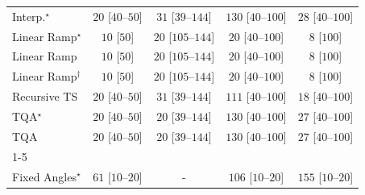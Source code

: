 \begin{tabular}{l|cccc|}
Interp.$^\star$ & {\cellcolor[HTML]{F5FBF2}} \color[HTML]{000000} $20$ [$40$--$50$] & {\cellcolor[HTML]{F3FAF0}} \color[HTML]{000000} $31$ [$39$--$144$] & {\cellcolor[HTML]{DFF3DA}} \color[HTML]{000000} $130$ [$40$--$100$] & {\cellcolor[HTML]{F4FBF1}} \color[HTML]{000000} $28$ [$40$--$100$] \\
Linear Ramp$^\star$ & {\cellcolor[HTML]{F7FCF5}} \color[HTML]{000000} $10$ [$50$] & {\cellcolor[HTML]{F5FBF2}} \color[HTML]{000000} $20$ [$105$--$144$] & {\cellcolor[HTML]{F5FBF2}} \color[HTML]{000000} $20$ [$40$--$100$] & {\cellcolor[HTML]{F7FCF5}} \color[HTML]{000000} $8$ [$100$] \\
Linear Ramp & {\cellcolor[HTML]{F7FCF5}} \color[HTML]{000000} $10$ [$50$] & {\cellcolor[HTML]{F5FBF2}} \color[HTML]{000000} $20$ [$105$--$144$] & {\cellcolor[HTML]{F5FBF2}} \color[HTML]{000000} $20$ [$40$--$100$] & {\cellcolor[HTML]{F7FCF5}} \color[HTML]{000000} $8$ [$100$] \\
Linear Ramp$^\dagger$ & {\cellcolor[HTML]{F7FCF5}} \color[HTML]{000000} $10$ [$50$] & {\cellcolor[HTML]{F5FBF2}} \color[HTML]{000000} $20$ [$105$--$144$] & {\cellcolor[HTML]{F5FBF2}} \color[HTML]{000000} $20$ [$40$--$100$] & {\cellcolor[HTML]{F7FCF5}} \color[HTML]{000000} $8$ [$100$] \\
Recursive TS & {\cellcolor[HTML]{F5FBF2}} \color[HTML]{000000} $20$ [$40$--$50$] & {\cellcolor[HTML]{F3FAF0}} \color[HTML]{000000} $31$ [$39$--$144$] & {\cellcolor[HTML]{E5F5E0}} \color[HTML]{000000} $111$ [$40$--$100$] & {\cellcolor[HTML]{F5FBF3}} \color[HTML]{000000} $18$ [$40$--$100$] \\
TQA$^\star$ & {\cellcolor[HTML]{F5FBF2}} \color[HTML]{000000} $20$ [$40$--$50$] & {\cellcolor[HTML]{F5FBF2}} \color[HTML]{000000} $20$ [$39$--$144$] & {\cellcolor[HTML]{DFF3DA}} \color[HTML]{000000} $130$ [$40$--$100$] & {\cellcolor[HTML]{F4FBF1}} \color[HTML]{000000} $27$ [$40$--$100$] \\
TQA & {\cellcolor[HTML]{F5FBF2}} \color[HTML]{000000} $20$ [$40$--$50$] & {\cellcolor[HTML]{F5FBF2}} \color[HTML]{000000} $20$ [$39$--$144$] & {\cellcolor[HTML]{DFF3DA}} \color[HTML]{000000} $130$ [$40$--$100$] & {\cellcolor[HTML]{F4FBF1}} \color[HTML]{000000} $27$ [$40$--$100$] \\
\cline{1-5}
\multicolumn{5}{c}{\rule{0pt}{8pt}SV} \\
\midrule
Fixed Angles$^\star$ & {\cellcolor[HTML]{EEF8EA}} \color[HTML]{000000} $61$ [$10$--$20$] & {\cellcolor[HTML]{000000}} \color[HTML]{F1F1F1} {\cellcolor{white}} \color{black} - & {\cellcolor[HTML]{E6F5E1}} \color[HTML]{000000} $106$ [$10$--$20$] & {\cellcolor[HTML]{D8F0D2}} \color[HTML]{000000} $155$ [$10$--$20$] \\

\end{tabular}
